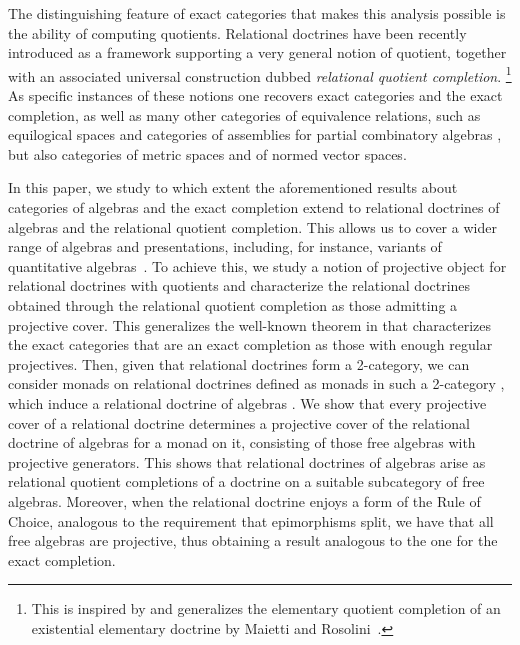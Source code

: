 The distinguishing feature of exact categories that makes this analysis possible is the ability of computing quotients. Relational doctrines \cite{DagninoP23, DagninoP25tac,DagninoP25apal} have been recently introduced as a framework supporting a very general notion of quotient, together with an associated universal construction dubbed \emph{relational quotient completion}. \footnote{This is inspired by and generalizes the elementary quotient completion of an existential elementary doctrine by Maietti and Rosolini~\cite{MaiettiME:eleqc}.} As specific instances of these notions one recovers exact categories and the exact completion, as well as many other categories of equivalence relations, such as equilogical spaces and categories of assemblies for partial combinatory algebras \cite{lmcs:4302}, but also categories of metric spaces and of normed vector spaces.

In this paper, we study to which extent the aforementioned results about categories of algebras and the exact completion extend to relational doctrines of algebras and the relational quotient completion. This allows us to cover a wider range of algebras and presentations, including, for instance, variants of quantitative algebras~\cite{MardarePP16, MardarePP17, Adamek22}.
% 
To achieve this, we study a notion of projective object for relational doctrines with quotients and characterize the relational doctrines obtained through the relational quotient completion as those admitting a projective cover. 
This generalizes the well-known theorem in \cite{CarboniA:regec} that characterizes the exact categories that are an exact completion as those with enough regular projectives.
%
Then, given that relational doctrines form a 2-category, we can consider monads on relational doctrines defined as monads in such a 2-category \cite{Street72}, which induce a relational doctrine of algebras \cite{DagninoP25tac}. We show that every projective cover of a relational doctrine determines a projective cover of the relational doctrine of algebras for a monad on it, consisting of those free algebras with projective generators. This shows that relational doctrines of algebras arise as relational quotient completions of a doctrine on a suitable subcategory of free algebras. Moreover, when the relational doctrine enjoys a form of the Rule of Choice, analogous to the requirement that epimorphisms split, we have that all free algebras are projective, thus obtaining a result analogous to the one for the exact completion.


